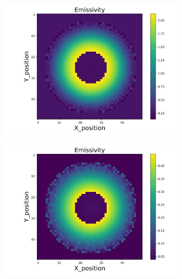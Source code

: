\begin{figure}[p]
\begin{minipage}{\textwidth}
        \centering
        \begin{subfigure}{0.325\textwidth}
            \centering
            \includegraphics[width=\textwidth]{figures/raw_data/25/exp/emi_cal.jpg}
        \end{subfigure}
        \begin{subfigure}{0.325\textwidth}
            \centering
            \includegraphics[width=\textwidth]{figures/raw_data/26/exp/emi_cal.jpg}
        \end{subfigure}
        \begin{subfigure}{0.325\textwidth}
            \centering

\end{subfigure}
\end{minipage}
\end{figure}
